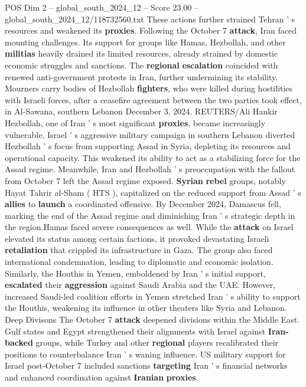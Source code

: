 \begin{textsample}{POS Dim 2 – global\_south\_2024\_12 – Score 23.00 – global\_south\_2024\_12/118732560.txt}
These actions further strained Tehran ' s resources and weakened its \textbf{proxies}.
Following the October 7 \textbf{attack}, Iran faced mounting challenges.
Its support for groups like Hamas, Hezbollah, and other \textbf{militias} heavily drained its limited resources, already strained by domestic economic struggles and sanctions.
The \textbf{regional} \textbf{escalation} coincided with renewed anti-government protests in Iran, further undermining its stability.
Mourners carry bodies of Hezbollah \textbf{fighters}, who were killed during hostilities with Israeli forces, after a ceasefire agreement between the two parties took effect, in Al-Sawana, southern Lebanon December 3, 2024.
REUTERS/Ali Hankir Hezbollah, one of Iran ' s most significant \textbf{proxies}, became increasingly vulnerable.
Israel ' s aggressive military campaign in southern Lebanon diverted Hezbollah ' s focus from supporting Assad in Syria, depleting its resources and operational capacity.
This weakened its ability to act as a stabilizing force for the Assad regime.
Meanwhile, Iran and Hezbollah ' s preoccupation with the fallout from October 7 left the Assad regime exposed. \textbf{Syrian} \textbf{rebel} groups, notably Hayat Tahrir al-Sham ( HTS ), capitalized on the reduced support from Assad ' s \textbf{allies} to \textbf{launch} a coordinated offensive.
By December 2024, Damascus fell, marking the end of the Assad regime and diminishing Iran ' s strategic depth in the region.Hamas faced severe consequences as well.
While the \textbf{attack} on Israel elevated its status among certain factions, it provoked devastating Israeli \textbf{retaliation} that crippled its infrastructure in Gaza.
The group also faced international condemnation, leading to diplomatic and economic isolation.
Similarly, the Houthis in Yemen, emboldened by Iran ' s initial support, \textbf{escalated} their \textbf{aggression} against Saudi Arabia and the UAE.
However, increased Saudi-led coalition efforts in Yemen stretched Iran ' s ability to support the Houthis, weakening its influence in other theaters like Syria and Lebanon.
Deep Divisons The October 7 \textbf{attack} deepened divisions within the Middle East.
Gulf states and Egypt strengthened their alignments with Israel against \textbf{Iran-backed} groups, while Turkey and other \textbf{regional} players recalibrated their positions to counterbalance Iran ' s waning influence.
US military support for Israel post-October 7 included sanctions \textbf{targeting} Iran ' s financial networks and enhanced coordination against \textbf{Iranian} \textbf{proxies}.

\end{textsample}
